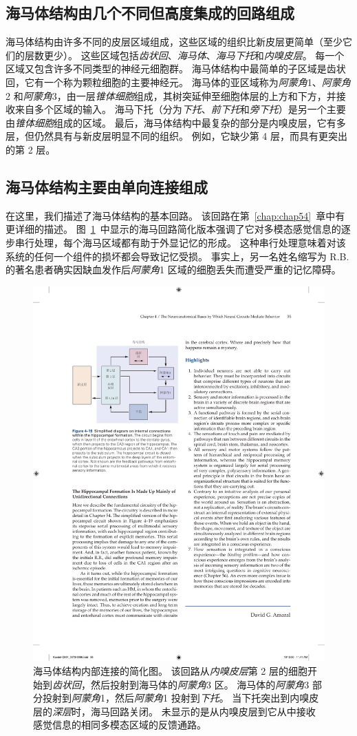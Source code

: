 \subsection{海马体结构由几个不同但高度集成的回路组成}

海马体结构由许多不同的皮层区域组成，这些区域的组织比新皮层更简单（至少它们的层数更少）。
这些区域包括\textit{齿状回}、\textit{海马体}、\textit{海马下托}和\textit{内嗅皮层}。 
每一个区域又包含许多不同类型的神经元细胞群。
海马体结构中最简单的子区域是齿状回，它有一个称为颗粒细胞的主要神经元。
海马体的亚区域称为\textit{阿蒙角}1、\textit{阿蒙角}2 和\textit{阿蒙角}3，由一层\textit{锥体细胞}组成，其树突延伸至细胞体层的上方和下方，并接收来自多个区域的输入。
海马下托（分为\textit{下托}、\textit{前下托}和\textit{旁下托}）是另一个主要由\textit{锥体细胞}组成的区域。
最后，海马体结构中最复杂的部分是内嗅皮层，它有多层，但仍然具有与新皮层明显不同的组织。
例如，它缺少第 4 层，而具有更突出的第 2 层。



\subsection{海马体结构主要由单向连接组成}

在这里，我们描述了海马体结构的基本回路。
该回路在第~\ref{chap:chap54}~章中有更详细的描述。
图~\ref{fig:4_19}~中显示的海马回路简化版本强调了它对多模态感觉信息的逐步串行处理，每个海马区域都有助于外显记忆的形成。
这种串行处理意味着对该系统的任何一个组件的损坏都会导致记忆受损。
事实上，另一名姓名缩写为 R.B. 的著名患者确实因缺血发作后\textit{阿蒙角}1 区域的细胞丢失而遭受严重的记忆障碍。


\begin{figure}[htbp]
	\centering
	\includegraphics[width=0.6\linewidth]{chap04/fig_4_19}
	\caption{海马体结构内部连接的简化图。 
		该回路从\textit{内嗅皮层}第 2 层的细胞开始到\textit{齿状回}，然后投射到海马体的\textit{阿蒙角}3 区。
		海马体的\textit{阿蒙角}3 部分投射到\textit{阿蒙角}1，然后\textit{阿蒙角}1 投射到\textit{下托}。
		当下托突出到内嗅皮层的\textit{深层}时，海马回路关闭。
		未显示的是从内嗅皮层到它从中接收感觉信息的相同多模态区域的反馈通路。}
	\label{fig:4_19}
\end{figure}


